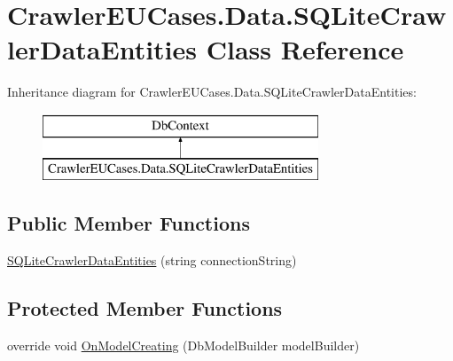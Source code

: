 \hypertarget{class_crawler_e_u_cases_1_1_data_1_1_s_q_lite_crawler_data_entities}{\section{Crawler\-E\-U\-Cases.\-Data.\-S\-Q\-Lite\-Crawler\-Data\-Entities Class Reference}
\label{class_crawler_e_u_cases_1_1_data_1_1_s_q_lite_crawler_data_entities}
}
Inheritance diagram for Crawler\-E\-U\-Cases.\-Data.\-S\-Q\-Lite\-Crawler\-Data\-Entities\-:\begin{figure}[H]
\begin{center}
\leavevmode
\includegraphics[height=2.000000cm]{class_crawler_e_u_cases_1_1_data_1_1_s_q_lite_crawler_data_entities}
\end{center}
\end{figure}
\subsection*{Public Member Functions}
\begin{DoxyCompactItemize}
\item 
\hyperlink{class_crawler_e_u_cases_1_1_data_1_1_s_q_lite_crawler_data_entities_a72576418d5fe07abe35ee84064fa203f}{S\-Q\-Lite\-Crawler\-Data\-Entities} (string connection\-String)
\end{DoxyCompactItemize}
\subsection*{Protected Member Functions}
\begin{DoxyCompactItemize}
\item 
override void \hyperlink{class_crawler_e_u_cases_1_1_data_1_1_s_q_lite_crawler_data_entities_ab965ee605db1e060d34ed59614110a5c}{On\-Model\-Creating} (Db\-Model\-Builder model\-Builder)
\end{DoxyCompactItemize}

